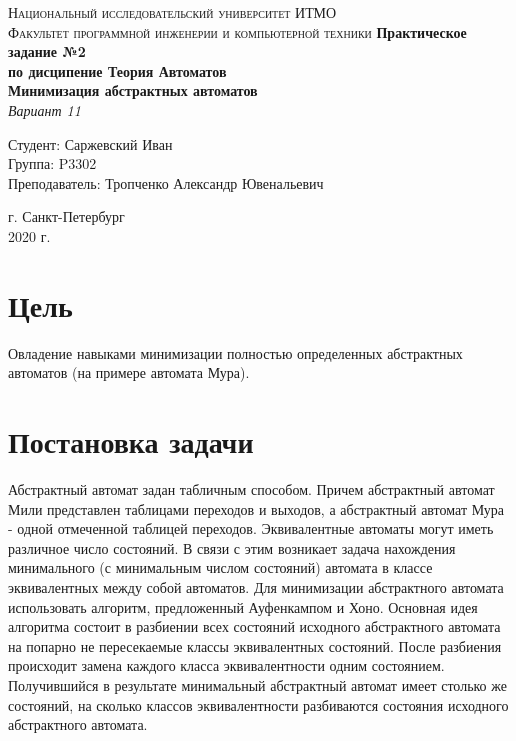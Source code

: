 \documentclass[12pt, a4paper]{article}
\begin{document}
\begin{titlepage}
\begin{center}

\textsc{Национальный исследовательский университет ИТМО\\[4mm]
Факультет программной инженерии и компьютерной техники}
\vfill
\textbf{Практическое задание №2\\[4mm]
по дисципение Теория Автоматов\\[4mm]
Минимизация абстрактных автоматов\\[4mm]
}
\textit{Вариант 11\\[16mm]}
\begin{flushright}
Студент: Саржевский Иван
\\[2mm]Группа: P3302
\\[2mm]Преподаватель: Тропченко Александр Ювенальевич
\end{flushright}
\vfill
г. Санкт-Петербург\\[2mm]
2020 г.

\end{center}
\end{titlepage}

\section*{Цель}

Овладение навыками минимизации полностью определенных абстрактных автоматов
(на примере автомата Мура).

\section*{Постановка задачи}

Абстрактный автомат задан табличным способом. Причем абстрактный автомат
Мили представлен таблицами переходов и выходов, а абстрактный автомат Мура - 
одной отмеченной таблицей переходов. Эквивалентные автоматы могут иметь
различное число состояний. В связи с этим возникает задача нахождения минимального
(с минимальным числом состояний) автомата в классе эквивалентных между
собой автоматов. Для минимизации абстрактного автомата использовать алгоритм,
предложенный Ауфенкампом и Хоно. Основная идея алгоритма состоит в разбиении
всех состояний исходного абстрактного автомата на попарно не пересекаемые 
классы эквивалентных состояний. После разбиения происходит замена каждого
класса эквивалентности одним состоянием. Получившийся в результате минимальный 
абстрактный автомат имеет столько же состояний, на сколько классов 
эквивалентности разбиваются состояния исходного абстрактного автомата.
\end{document}
